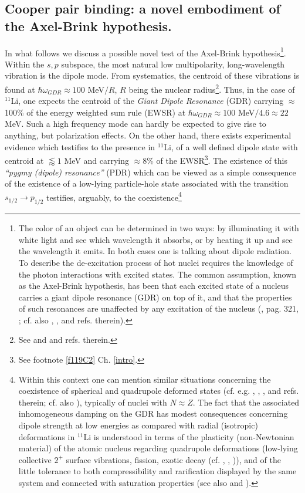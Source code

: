 \subsection{Cooper pair binding: a novel embodiment of the Axel-Brink hypothesis.}\label{sect1F1}
In what follows we discuss a possible novel test of the Axel-Brink hypothesis\footnote{The color of an object can be determined in two ways: by illuminating it with white light and see which wavelength it absorbs, or by heating it up and see the  wavelength it emits. In both cases one is talking about dipole radiation. To describe the de-excitation process of hot nuclei requires the knowledge of the photon interactions with excited states. The common assumption, known as the Axel-Brink hypothesis, has been that each excited state of a nucleus carries a giant dipole resonance (GDR) on top of it, and that the properties of such resonances are unaffected by any excitation of the nucleus (\cite{Brink:55}, \cite{Lynn:68} pag. 321, \cite{Axel:62}; cf. also \cite{Bertsch:86}, \cite{Bortignon:98}, \cite{Martin:17} and refs. therein).}. Within the $s,p$ subspace, the most natural low multipolarity, long-wavelength vibration is the dipole mode. From systematics, the centroid of these vibrations is found at $\hbar \omega_{GDR}\approx 100$ MeV$/R$, $R$ being the nuclear radius\footnote{See \cite{Bohr:75} \cite{Bortignon:98} and \cite{Bertsch:05} and refs. therein.}. Thus, in the case of $^{11}$Li, one expects the centroid of the \textit{Giant Dipole Resonance} (GDR) carrying $\approx$100\% of the energy weighted sum rule (EWSR) at $\hbar \omega_{GDR}\approx 100$ MeV$/4.6\approx 22$ MeV. Such a high frequency mode can hardly be expected to give rise to anything, but polarization effects. On the other hand, there exists experimental evidence which testifies to the presence in $^{11}$Li, of a well defined dipole state with centroid at $\lessapprox1$ MeV and carrying $\approx 8$\% of the EWSR\footnote{See footnote \ref{f119C2} Ch. \ref{intro}.}. The existence of this \textit{``pygmy (dipole) resonance''} (PDR) which can be viewed as a simple consequence of the existence of a low-lying particle-hole state associated with the transition $s_{1/2}\rightarrow p_{1/2}$ testifies, arguably, to the coexistence\footnote{Within this context one can mention similar situations concerning the coexistence of spherical and quadrupole deformed states (cf. e.g. \cite{Wimmer:10}, \cite{Federman:65}, \cite{Federman:66}, \cite{Donau:67} and refs. therein; cf. also \cite{Bohr:63}), typically of nuclei with $N\approx Z$. The fact that the associated inhomogeneous damping on the GDR has modest consequences concerning dipole strength at low energies as compared with radial (isotropic) deformations in $^{11}$Li is understood in terms of the plasticity (non-Newtonian material)  of the atomic nucleus regarding quadrupole deformations (low-lying collective $2^+$ surface vibrations, fission, exotic decay (cf. \cite{Barranco:88}, \cite{Barranco:89,Bertsch:88b}, \cite{Bertsch:87})), and of the little tolerance to both compressibility and rarification displayed by the same system and connected with saturation properties (see also \cite{Broglia:19} and \cite{Broglia:19b}).} 
